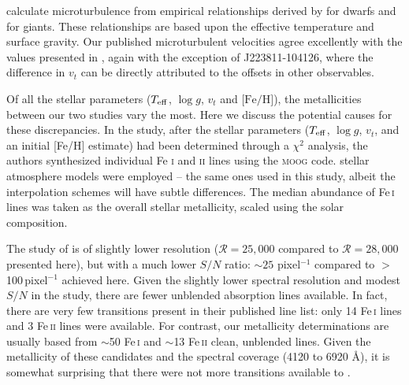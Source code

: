 \documentclass{emulateapj}
\begin{document}
\citet{wylie-de-boer;et-al_2012} calculate microturbulence from empirical relationships derived by \citet{reddy;et-al_2003} for dwarfs and \citet{fulbright_2000} for giants. These relationships are based upon the effective temperature and surface gravity. Our published microturbulent velocities agree excellently with the values presented in \citet{wylie-de-boer;et-al_2012}, again with the exception of J223811-104126, where the difference in $v_{t}$ can be directly attributed to the offsets in other observables.


Of all the stellar parameters ($T_{\rm eff}$, $\log{g}$, $v_{t}$ and $\mbox{[Fe/H]}$), the metallicities between our two studies vary the most. Here we discuss the potential causes for these discrepancies. In the \citet{wylie-de-boer;et-al_2012} study, after the stellar parameters ($T_{\rm eff}$, $\log{g}$, $v_{t}$, and an initial [Fe/H] estimate) had been determined through a $\chi^2$ analysis, the authors synthesized individual Fe \textsc{i} and \textsc{ii} lines using the \textsc{moog} code. \citet{castelli;kurucz_2003} stellar atmosphere models were employed \--- the same ones used in this study, albeit the interpolation schemes will have subtle differences. The median abundance of Fe\,\textsc{i} lines was taken as the overall stellar metallicity, scaled using the \citet{grevesse;sauval_1998} solar composition.


The study of \citet{wylie-de-boer;et-al_2012} is of slightly lower resolution ($\mathcal{R} = 25,000$ compared to $\mathcal{R} = 28,000$ presented here), but with a much lower $S/N$ ratio: $\sim{}25$ pixel$^{-1}$ compared to $>$100\,pixel$^{-1}$ achieved here. Given the slightly lower spectral resolution and modest $S/N$ in the \citet{wylie-de-boer;et-al_2012} study, there are fewer unblended absorption lines available. In fact, there are very few transitions present in their published line list: only 14 Fe\,\textsc{i} lines and 3 Fe\,\textsc{ii} lines were available. For contrast, our metallicity determinations are usually based from ${\sim}$50 Fe\,\textsc{i} and ${\sim}$13 Fe\,\textsc{ii} clean, unblended lines. Given the metallicity of these candidates and the spectral coverage (4120 to 6920 {\AA}), it is somewhat surprising that there were not more transitions available to \citet{wylie-de-boer;et-al_2012}. 
\end{document}
